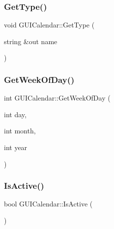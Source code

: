 \hypertarget{class_g_u_i_calendar_a4082b43dd37621774b9772feec3b960f}{}\label{class_g_u_i_calendar_a4082b43dd37621774b9772feec3b960f} 
\subsubsection{\texorpdfstring{Get\+Type()}{GetType()}}
{\footnotesize\ttfamily void G\+U\+I\+Calendar\+::\+Get\+Type (\begin{DoxyParamCaption}\item[{string \&out}]{name }\end{DoxyParamCaption})}

\hypertarget{class_g_u_i_calendar_a8893125b73ff8ed7dd0ff9835689a141}{}\label{class_g_u_i_calendar_a8893125b73ff8ed7dd0ff9835689a141} 
\subsubsection{\texorpdfstring{Get\+Week\+Of\+Day()}{GetWeekOfDay()}}
{\footnotesize\ttfamily int G\+U\+I\+Calendar\+::\+Get\+Week\+Of\+Day (\begin{DoxyParamCaption}\item[{int}]{day,  }\item[{int}]{month,  }\item[{int}]{year }\end{DoxyParamCaption})}

\hypertarget{class_g_u_i_calendar_a26443bcd88bb3526e7947072a0535d1b}{}\label{class_g_u_i_calendar_a26443bcd88bb3526e7947072a0535d1b} 
\subsubsection{\texorpdfstring{Is\+Active()}{IsActive()}}
{\footnotesize\ttfamily bool G\+U\+I\+Calendar\+::\+Is\+Active (\begin{DoxyParamCaption}{ }\end{DoxyParamCaption})}

\hypertarget{class_g_u_i_calendar_ac2480135211c326cfe09ab164a7fef92}{}\label{class_g_u_i_calendar_ac2480135211c326cfe09ab164a7fef92} 
